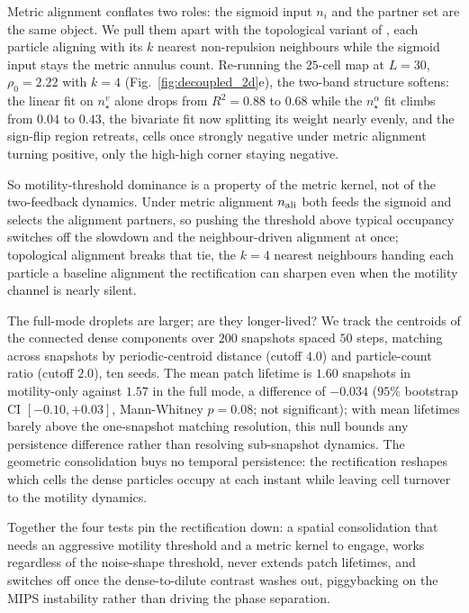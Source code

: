 \documentclass[11pt,a4paper]{article}
\begin{document}
\label{sec:decoupled-topo}
Metric alignment conflates two roles: the sigmoid input $n_i$
and the partner set are the same object. We pull them apart with
the topological variant of \citet{Ginelli2010}, each
particle aligning with its $k$ nearest non-repulsion neighbours
while the sigmoid input stays the metric annulus count.
Re-running the $25$-cell map at $L = 30$, $\rho_0 = 2.22$ with
$k = 4$ (Fig.~\ref{fig:decoupled_2d}e), the two-band structure
softens: the linear fit on $n_\star^v$ alone drops from $R^2 =
0.88$ to $0.68$ while the $n_\star^\alpha$ fit climbs from
$0.04$ to $0.43$, the bivariate fit now splitting its weight
nearly evenly, and the sign-flip region retreats, cells once
strongly negative under metric alignment turning positive,
only the high-high corner staying negative.

So motility-threshold dominance is a property of the metric
kernel, not of the two-feedback dynamics. Under metric alignment
$n_{\rm ali}$ both feeds the sigmoid and selects the alignment
partners, so pushing the threshold above typical occupancy
switches off the slowdown and the neighbour-driven alignment at
once; topological alignment breaks that tie, the $k = 4$ nearest
neighbours handing each particle a baseline alignment the
rectification can sharpen even when the motility channel is
nearly silent.

\label{sec:decoupled-lifetime}
The full-mode droplets are larger; are they longer-lived? We
track the centroids of the connected dense components over $200$
snapshots spaced $50$ steps, matching across snapshots by
periodic-centroid distance (cutoff $4.0$) and particle-count
ratio (cutoff $2.0$), ten seeds. The mean patch lifetime is
$1.60$ snapshots in motility-only against $1.57$ in the full
mode, a difference of $-0.034$ ($95\%$ bootstrap CI $[-0.10,
+0.03]$, Mann-Whitney $p = 0.08$; not significant); with mean
lifetimes barely above the one-snapshot matching resolution, this
null bounds any persistence difference rather than resolving
sub-snapshot dynamics. The geometric consolidation buys no
temporal persistence: the rectification reshapes which cells the
dense particles occupy at each instant while leaving cell
turnover to the motility dynamics.

Together the four tests pin the rectification down: a spatial
consolidation that needs an aggressive motility threshold and a
metric kernel to engage, works regardless of the noise-shape
threshold, never extends patch lifetimes, and switches off once
the dense-to-dilute contrast washes out, piggybacking on the
MIPS instability rather than driving the phase separation.
\end{document}
